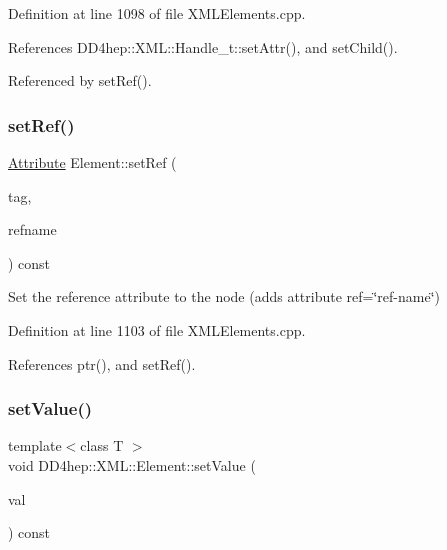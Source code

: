 Definition at line 1098 of file X\+M\+L\+Elements.\+cpp.



References D\+D4hep\+::\+X\+M\+L\+::\+Handle\+\_\+t\+::set\+Attr(), and set\+Child().



Referenced by set\+Ref().

\hypertarget{class_d_d4hep_1_1_x_m_l_1_1_element_ab2caeeb8220e43f9480f15e3006c784c}{}\label{class_d_d4hep_1_1_x_m_l_1_1_element_ab2caeeb8220e43f9480f15e3006c784c} 
\subsubsection{\texorpdfstring{set\+Ref()}{setRef()}\hspace{0.1cm}{\footnotesize\ttfamily [2/2]}}
{\footnotesize\ttfamily \hyperlink{namespace_d_d4hep_1_1_x_m_l_a5c19b7116be99d69b4b22d911357baaf}{Attribute} Element\+::set\+Ref (\begin{DoxyParamCaption}\item[{const \hyperlink{namespace_d_d4hep_1_1_x_m_l_a09e5d9cc86ed782f6826dfe0778c1815}{Xml\+Char} $\ast$}]{tag,  }\item[{const std\+::string \&}]{refname }\end{DoxyParamCaption}) const}



Set the reference attribute to the node (adds attribute ref=\char`\"{}ref-\/name\char`\"{}) 



Definition at line 1103 of file X\+M\+L\+Elements.\+cpp.



References ptr(), and set\+Ref().

\hypertarget{class_d_d4hep_1_1_x_m_l_1_1_element_a86df8ae52c2b8c1dc75c292a04da7882}{}\label{class_d_d4hep_1_1_x_m_l_1_1_element_a86df8ae52c2b8c1dc75c292a04da7882} 
\subsubsection{\texorpdfstring{set\+Value()}{setValue()}}
{\footnotesize\ttfamily template$<$class T $>$ \\
void D\+D4hep\+::\+X\+M\+L\+::\+Element\+::set\+Value (\begin{DoxyParamCaption}\item[{const \hyperlink{class_t}{T} \&}]{val }\end{DoxyParamCaption}) const\hspace{0.3cm}{\ttfamily [inline]}}



